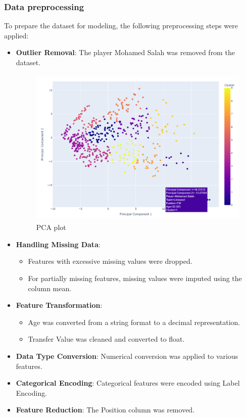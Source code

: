 \documentclass[12pt,a4paper]{report}
\begin{document}
\subsubsection{Data preprocessing}
To prepare the dataset for modeling, the following preprocessing steps were applied:
\begin{itemize}
    \item \textbf{Outlier Removal}: The player Mohamed Salah was removed from the dataset.
    \begin{figure}[H]
        \centering
        \includegraphics[width=5in,height=3in]{media/image16.png}
        \caption{PCA plot}
    \end{figure}
    \item \textbf{Handling Missing Data}:
    \begin{itemize}
        \item Features with excessive missing values were dropped.
        \item For partially missing features, missing values were imputed using the column mean.
    \end{itemize}
    \item \textbf{Feature Transformation}:
    \begin{itemize}
        \item Age was converted from a string format to a decimal representation.
        \item Transfer Value was cleaned and converted to float.
    \end{itemize}
    \item \textbf{Data Type Conversion}: Numerical conversion was applied to various features.
    \item \textbf{Categorical Encoding}: Categorical features were encoded using Label Encoding.
    \item \textbf{Feature Reduction}: The Position column was removed.
\end{itemize}
\end{document}
